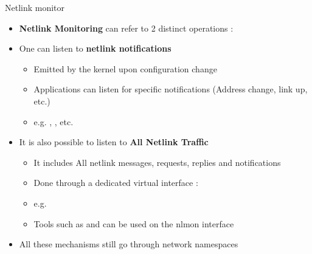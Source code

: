 \begin{frame}{Netlink monitor}
	\begin{itemize}
		\item \textbf{Netlink Monitoring} can refer to 2 distinct operations :
		\item One can listen to \textbf{netlink notifications}
			\begin{itemize}
				\item Emitted by the kernel upon configuration change
				\item Applications can listen for specific notifications (Address change, link up, etc.)
				\item e.g. , , etc.
			\end{itemize}
		\item It is also possible to listen to \textbf{All Netlink Traffic}
			\begin{itemize}
				\item It includes All netlink messages, requests, replies and notifications
				\item Done through a dedicated virtual interface : 
				\item e.g. 
				\item Tools such as  and  can be used on the nlmon interface
			\end{itemize}
		\item All these mechanisms still go through network namespaces
	\end{itemize}
\end{frame}

